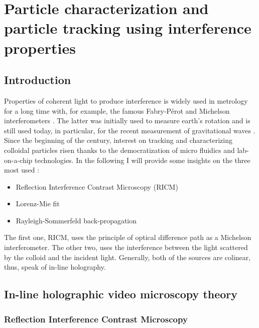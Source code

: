 \newpage
\section{Particle characterization and particle tracking using interference properties}
		\label{sec:chapter2}

\subsection{Introduction}

Properties of coherent light to produce interference is widely used in metrology for a long time with, for example, the famous Fabry-Pérot  \cite{fabry_theorie_1899, perot_application_1899} and Michelson interferometers \cite{michelson_relative_1887}. The latter was initially used to measure earth's rotation and is still used today, in particular, for the recent measurement of gravitational waves
\cite{ligo_scientific_collaboration_and_virgo_collaboration_gw151226_2016}. 
Since the beginning of the century, interest on tracking and characterizing colloidal particles risen thanks to the democratization of micro fluidics and lab-on-a-chip technologies. In the following I will provide some insights on the three most used :

\begin{itemize}
	\item Reflection Interference Contrast Microscopy (\gls{RICM})
	\item Lorenz-Mie fit
	\item Rayleigh-Sommerfeld back-propagation
\end{itemize}

The first one, \gls{RICM}, uses the principle of optical difference path as a Michelson interferometer. The other two, uses the interference between the light scattered by the colloid and the incident light. Generally, both of the sources  are colinear, thus, speak of in-line holography. 

\subsection{In-line holographic video microscopy theory}

\subsubsection{Reflection Interference Contrast Microscopy}


